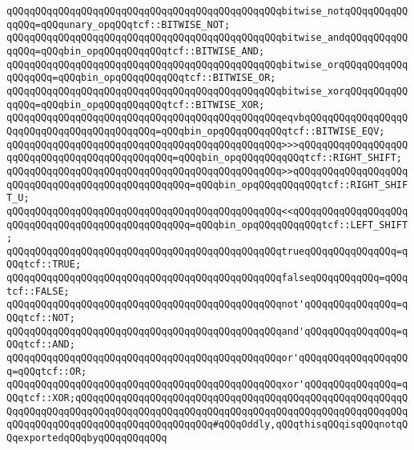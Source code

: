 \newline
\verb|qQQqqQQqqQQqqQQqqQQqqQQqqQQqqQQqqQQqqQQqqQQqqQQqbitwise_notqQQqqQQqqQQqqQQq=qQQqunary_opqQQqtcf::BITWISE_NOT;|\newline
\verb|qQQqqQQqqQQqqQQqqQQqqQQqqQQqqQQqqQQqqQQqqQQqqQQqbitwise_andqQQqqQQqqQQqqQQq=qQQqbin_opqQQqqQQqqQQqtcf::BITWISE_AND;|\newline
\verb|qQQqqQQqqQQqqQQqqQQqqQQqqQQqqQQqqQQqqQQqqQQqqQQqbitwise_orqQQqqQQqqQQqqQQqqQQq=qQQqbin_opqQQqqQQqqQQqtcf::BITWISE_OR;|\newline
\verb|qQQqqQQqqQQqqQQqqQQqqQQqqQQqqQQqqQQqqQQqqQQqqQQqbitwise_xorqQQqqQQqqQQqqQQq=qQQqbin_opqQQqqQQqqQQqtcf::BITWISE_XOR;|\newline
\newline
\verb|qQQqqQQqqQQqqQQqqQQqqQQqqQQqqQQqqQQqqQQqqQQqqQQqeqvbqQQqqQQqqQQqqQQqqQQqqQQqqQQqqQQqqQQqqQQqqQQq=qQQqbin_opqQQqqQQqqQQqtcf::BITWISE_EQV;|\newline
\newline
\verb|qQQqqQQqqQQqqQQqqQQqqQQqqQQqqQQqqQQqqQQqqQQqqQQq>>>qQQqqQQqqQQqqQQqqQQqqQQqqQQqqQQqqQQqqQQqqQQqqQQq=qQQqbin_opqQQqqQQqqQQqtcf::RIGHT_SHIFT;|\newline
\verb|qQQqqQQqqQQqqQQqqQQqqQQqqQQqqQQqqQQqqQQqqQQqqQQq>>qQQqqQQqqQQqqQQqqQQqqQQqqQQqqQQqqQQqqQQqqQQqqQQqqQQq=qQQqbin_opqQQqqQQqqQQqtcf::RIGHT_SHIFT_U;|\newline
\verb|qQQqqQQqqQQqqQQqqQQqqQQqqQQqqQQqqQQqqQQqqQQqqQQq<<qQQqqQQqqQQqqQQqqQQqqQQqqQQqqQQqqQQqqQQqqQQqqQQqqQQq=qQQqbin_opqQQqqQQqqQQqtcf::LEFT_SHIFT;|\newline
\newline
\verb|qQQqqQQqqQQqqQQqqQQqqQQqqQQqqQQqqQQqqQQqqQQqqQQqtrueqQQqqQQqqQQqqQQq=qQQqtcf::TRUE;|\newline
\verb|qQQqqQQqqQQqqQQqqQQqqQQqqQQqqQQqqQQqqQQqqQQqqQQqfalseqQQqqQQqqQQq=qQQqtcf::FALSE;|\newline
\verb|qQQqqQQqqQQqqQQqqQQqqQQqqQQqqQQqqQQqqQQqqQQqqQQqnot'qQQqqQQqqQQqqQQq=qQQqtcf::NOT;|\newline
\verb|qQQqqQQqqQQqqQQqqQQqqQQqqQQqqQQqqQQqqQQqqQQqqQQqand'qQQqqQQqqQQqqQQq=qQQqtcf::AND;|\newline
\verb|qQQqqQQqqQQqqQQqqQQqqQQqqQQqqQQqqQQqqQQqqQQqqQQqor'qQQqqQQqqQQqqQQqqQQq=qQQqtcf::OR;|\newline
\verb|qQQqqQQqqQQqqQQqqQQqqQQqqQQqqQQqqQQqqQQqqQQqqQQqxor'qQQqqQQqqQQqqQQq=qQQqtcf::XOR;qQQqqQQqqQQqqQQqqQQqqQQqqQQqqQQqqQQqqQQqqQQqqQQqqQQqqQQqqQQqqQQqqQQqqQQqqQQqqQQqqQQqqQQqqQQqqQQqqQQqqQQqqQQqqQQqqQQqqQQqqQQqqQQqqQQqqQQqqQQqqQQqqQQqqQQqqQQqqQQqqQQq#qQQqOddly,qQQqthisqQQqisqQQqnotqQQqexportedqQQqbyqQQqqQQqqQQq|\newline
